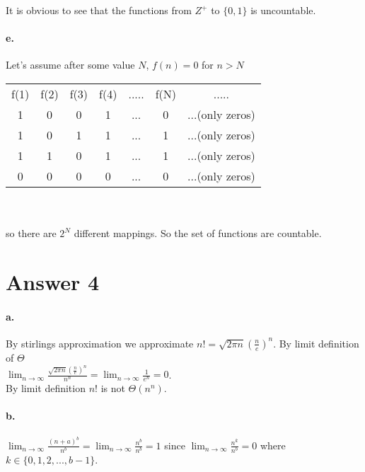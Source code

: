 \documentclass[11pt]{article}
\begin{document}
It is obvious to see that the functions from $Z^+$ to $\{0,1\}$ is uncountable.

\paragraph{e.}
Let's assume after some value $N$, $f(n) = 0$ for $n > N$\\

\begin{tabular}{c c c c c c c}
     f(1) & f(2) & f(3) & f(4) & ..... & f(N) & ..... \\
     1 & 0 & 0 & 1 & ... & 0 & ...(only zeros) \\ 
     1 & 0 & 1 & 1 & ... & 1 & ...(only zeros)\\ 
     1 & 1 & 0 & 1 & ... & 1 & ...(only zeros)\\ 
     0 & 0 & 0 & 0 & ... & 0 & ...(only zeros)\\ 
\end{tabular} \\\\

so there are $2^N$ different mappings. So the set of functions are countable.\\

\section*{Answer 4}

\paragraph{a.}

By stirlings approximation we approximate $n! = \sqrt{2\pi n}(\frac{n}{e})^n$. By limit definition of $\Theta$\\

$\lim_{n\to\infty} \frac{\sqrt{2\pi n}(\frac{n}{e})^n}{n^n} = \lim_{n\to\infty} \frac{1}{e^n} = 0$.\\

By limit definition $n!$ is not $\Theta(n^n)$.\\

\paragraph{b.}

$\lim_{n\to\infty} \frac{(n+a)^b}{n^b} = \lim_{n\to\infty} \frac{n^b}{n^b} = 1$ since $\lim_{n\to\infty} \frac{n^k}{n^b} = 0$ where $k \in \{0,1,2, ...,b-1\}$.\\
\end{document}
